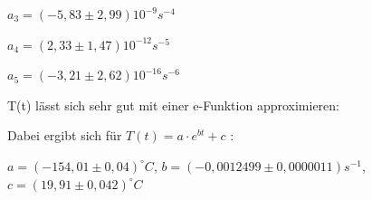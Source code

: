 $
a_{3}=(-5,83 \pm 2,99)10^{-9}s^{-4}
$

$
a_{4}=(2,33 \pm 1,47)10^{-12}s^{-5}
$

$
a_{5}=(-3,21 \pm 2,62)10^{-16}s^{-6} 
$\\

T(t) lässt sich sehr gut mit einer e-Funktion approximieren:

Dabei ergibt sich für $ T(t) = a \cdot e^{bt} + c $ :

$a = (-154,01 \pm 0,04)^{\circ}C$,
$b=(-0,0012499 \pm 0,0000011)s^{-1}$,
$c=(19,91 \pm 0,042)^{\circ}C$

